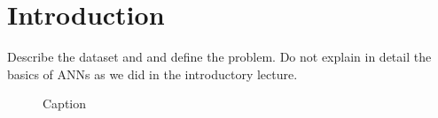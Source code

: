 \section{Introduction}

Describe the dataset and and define the problem. Do not explain in detail the basics of ANNs as we did in the introductory lecture.





\begin{figure}[H]
    \centering
    \caption{Caption}
    \label{fig:my_label}
\end{figure}

























